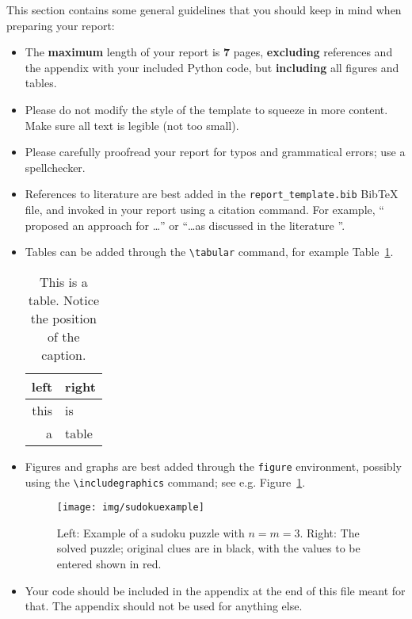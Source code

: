 \documentclass[11pt]{article}
\begin{document}
This section contains some general guidelines that you should keep in mind when preparing your report:
\begin{itemize}
	\item
		The \textbf{maximum} length of your report is \textbf{7} pages, \textbf{excluding} references and the appendix with your included Python code, but \textbf{including} all figures and tables.
	\item
		Please do not modify the style of the template to squeeze in more content. Make sure all text is legible (not too small).
	\item
		Please carefully proofread your report for typos and grammatical errors; use a spellchecker.
	\item
		References to literature are best added in the \texttt{report\_template.bib} BibTeX file, and invoked in your report using a citation command. For example, “\citet{shannon1950xxii} proposed an approach for \dots” or “\dots as discussed in the literature \citep{shannon1950xxii}”.
	\item
		Tables can be added through the \texttt{{\textbackslash}tabular} command, for example Table~\ref{tab:a_table}.
		\begin{table}
			\centering
			\caption{This is a table. Notice the position of the caption.}\label{tab:a_table}
			\begin{tabular}{rl}
				\toprule
				\textbf{left} & \textbf{right}\\
				\midrule
				this & is \\
				a & table\\
				\bottomrule
			\end{tabular}
		\end{table}
	\item
		Figures and graphs are best added through the \texttt{figure} environment, possibly using the \texttt{{\textbackslash}includegraphics} command; see e.g. Figure~\ref{fig:example}.
		\begin{figure}
			\centering
			\texttt{[image: img/sudokuexample]}
			\caption{Left: Example of a sudoku puzzle with $n=m=3$. Right: The solved puzzle; original clues are in black, with the values to be entered shown in red.}\label{fig:example}
		\end{figure}
	\item
		Your code should be included in the appendix at the end of this file meant for that.
		The appendix should not be used for anything else.
\end{itemize}
\end{document}
